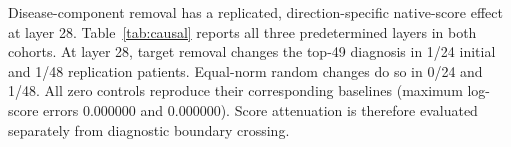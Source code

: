 Disease-component removal has a replicated, direction-specific native-score effect at layer 28. Table~\ref{tab:causal} reports all three predetermined layers in both cohorts. At layer 28, target removal changes the top-49 diagnosis in 1/24 initial and 1/48 replication patients. Equal-norm random changes do so in 0/24 and 1/48. All zero controls reproduce their corresponding baselines (maximum log-score errors 0.000000 and 0.000000). Score attenuation is therefore evaluated separately from diagnostic boundary crossing.
